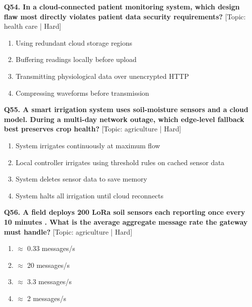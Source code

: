 \noindent\textbf{Q54. In a cloud-connected patient monitoring system, which design flaw most directly violates patient data security requirements?} \hfill [Topic: health care | Hard]
\begin{enumerate}[label=(\alph*),topsep=2pt,itemsep=1pt,partopsep=0pt,parsep=0pt]
    \item {Using redundant cloud storage regions}
    \item {Buffering readings locally before upload}
    \item {Transmitting physiological data over unencrypted HTTP}
    \item {Compressing waveforms before transmission}
\end{enumerate}
\vspace{2mm}

\noindent\textbf{Q55. A smart irrigation system uses soil-moisture sensors and a cloud model. During a multi-day network outage, which edge-level fallback best preserves crop health?} \hfill [Topic: agriculture | Hard]
\begin{enumerate}[label=(\alph*),topsep=2pt,itemsep=1pt,partopsep=0pt,parsep=0pt]
    \item {System irrigates continuously at maximum flow}
    \item {Local controller irrigates using threshold rules on cached sensor data}
    \item {System deletes sensor data to save memory}
    \item {System halts all irrigation until cloud reconnects}
\end{enumerate}
\vspace{2mm}

\noindent\textbf{Q56. A field deploys 200 LoRa soil sensors each reporting once every 10 minutes . What is the average aggregate message rate the gateway must handle?} \hfill [Topic: agriculture | Hard]
\begin{enumerate}[label=(\alph*),topsep=2pt,itemsep=1pt,partopsep=0pt,parsep=0pt]
    \item {$\approx$ 0.33 messages/s}
    \item {$\approx$ 20 messages/s}
    \item {$\approx$ 3.3 messages/s}
    \item {$\approx$ 2 messages/s}
\end{enumerate}
\vspace{2mm}

